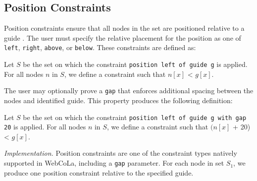 

\subsection{Position Constraints}

Position constraints ensure that all nodes in the set are positioned relative to
a guide . The user must specify the relative
placement for the position as one of \texttt{left}, \texttt{right}, 
\texttt{above}, or \texttt{below}. These constraints are defined as:

\begin{definition}
Let $S$ be the set on which the constraint \texttt{position left of guide g} is applied.
For all nodes $n$ in $S$, we define a constraint such that $n[x]$ < $g[x]$.
\end{definition}

The user may optionally prove a \texttt{gap} that enforces additional spacing
between the nodes and identified guide. This property produces the following
definition:

\begin{definition}
Let $S$ be the set on which the constraint \texttt{position left of guide g with gap 20} is applied.
For all nodes $n$ in $S$, we define a constraint such that $(n[x]$ + 20) < $g[x]$.
\end{definition}

\emph{Implementation.}
Position constraints are one of the constraint types natively supported in
WebCoLa, including a \texttt{gap} parameter. For each node
in set $S_1$, we produce one position constraint relative to the specified guide.

